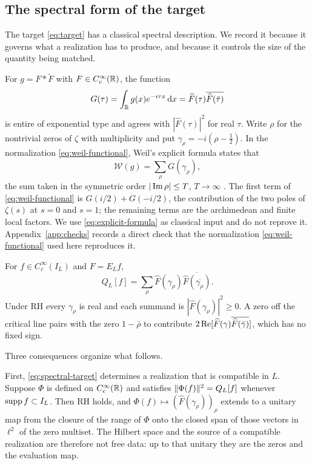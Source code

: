 \subsection{The spectral form of the target}\label{subsec:spectral}
The target \eqref{eq:target} has a classical spectral description. We record
it because it governs what a realization has to produce, and because it
controls the size of the quantity being matched.

For $g=F*\widetilde F$ with $F\in C_c^\infty(\mathbb R)$, the function
\begin{equation}\label{eq:entire-transform}
 G(\tau)=\int_\mathbb R g(x)e^{-i\tau x}\,\mathrm d x
 =\widehat F(\tau)\overline{\widehat F(\bar\tau)}
\end{equation}
is entire of exponential type and agrees with $|\widehat F(\tau)|^2$ for real
$\tau$. Write $\rho$ for the nontrivial zeros of $\zeta$ with multiplicity and
put $\gamma_\rho=-i(\rho-\tfrac12)$. In the normalization
\eqref{eq:weil-functional}, Weil's explicit formula states that
\begin{equation}\label{eq:explicit-formula}
 \mathcal W(g)=\sum_\rho G(\gamma_\rho),
\end{equation}
the sum taken in the symmetric order $|\operatorname{Im}\rho|\leq T$, $T\to\infty$
\cite{Suzuki,CCM}. The first term of \eqref{eq:weil-functional} is
$G(i/2)+G(-i/2)$, the contribution of the two poles of $\zeta(s)$ at $s=0$
and $s=1$; the remaining terms are the archimedean and finite local factors.
We use \eqref{eq:explicit-formula} as classical input and do not reprove it.
Appendix~\ref{app:checks} records a direct check that the normalization
\eqref{eq:weil-functional} used here reproduces it.

\begin{corollary}\label{cor:spectral}
For $f\in C_c^\infty(I_L)$ and $F=E_Lf$,
\begin{equation}\label{eq:spectral-target}
 Q_L[f]=\sum_\rho\widehat F(\gamma_\rho)
        \overline{\widehat F(\overline{\gamma_\rho})}.
\end{equation}
Under RH every $\gamma_\rho$ is real and each summand is
$|\widehat F(\gamma_\rho)|^2\geq0$. A zero off the critical line pairs with
the zero $1-\bar\rho$ to contribute
$2\operatorname{Re}[\widehat F(\gamma)\overline{\widehat F(\bar\gamma)}]$, which has no
fixed sign.
\end{corollary}

Three consequences organize what follows.

First, \eqref{eq:spectral-target} determines a realization that is
compatible in $L$. Suppose $\Phi$ is defined on $C_c^\infty(\mathbb R)$ and
satisfies $\lVert \Phi(f)\rVert^2=Q_L[f]$ whenever $\operatorname{supp} f\subset I_L$. Then RH
holds, and $\Phi(f)\mapsto(\widehat F(\gamma_\rho))_\rho$ extends to a
unitary map from the closure of the range of $\Phi$ onto the closed span of
those vectors in $\ell^2$ of the zero multiset. The Hilbert space and the
source of a compatible realization are therefore not free data: up to that
unitary they are the zeros and the evaluation map.

